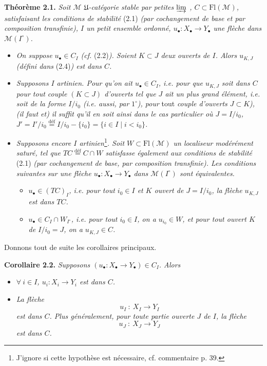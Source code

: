 \documentclass[11pt]{article}
\newcommand{\msp}[1]{\marginpar{\footnotesize [#1]}}
\newcommand{\Fl}{\mathrm{Fl}}
\newcommand{\M}{\mathcal{M}}
\begin{document}
\textbf{Théorème 2.1.} \textit{Soit $\M$ $\mathfrak{U}$-catégorie stable par petites $\varinjlim$ , $C \subset \Fl(\M)$, satisfaisant les conditions de stabilité} \textup{(2.1)} \textit{(par cochangement de base et par composition transfinie), $I$ un petit ensemble ordonné, $u_\bullet : X_\bullet \longrightarrow Y_\bullet$ une flèche dans $\M(I^\circ)$.}
\begin{itemize}[leftmargin=3em]
\item[$1^\circ$)] \textit{On suppose $u_\bullet \in C_I$ (cf.} \textup{(2.2)}\textit{). Soient $K \subset J$ deux ouverts de $I$. Alors $u_{K,J}$ (défini dans} \textup{(2.4)}\textit{) est dans $C$.}
\item[$2^\circ$)] \textit{Supposons $I$ artinien. Pour qu'on ait $u_\bullet \in C_I$, i.e. pour que $u_{K,J}$ soit dans $C$ pour tout couple $(K \subset J)$ d'ouverts tel que $J$ ait un plus grand élément, i.e. soit de la forme $I/i_0$ (i.e. aussi, par} $1^\circ$\textit{), pour} \textup{tout} \textit{couple d'ouverts $J \subset K$), (il faut et) il suffit qu'il en soit ainsi dans le cas particulier où $J = I/i_0$, $J' = I'/i_0 \overset{\text{déf}}{=} I/i_0 - \{i_0\} = \{i \in I \mid i < i_0\}$.}

\msp{page 27}
\item[$3^\circ$)] \textit{Supposons encore $I$ artinien}\footnote[11]{J'ignore si cette hypothèse est nécessaire, cf. commentaire p. 39.}\textit{. Soit $W \subset \Fl(\M)$ un localiseur modérément saturé, tel que $TC \overset{\text{déf}}{=} C \cap W$ satisfasse également aux conditions de stabilité} \textup{(2.1)} \textit{(par cochangement de base, par composition transfinie). Les conditions suivantes sur une flèche $u_\bullet : X_\bullet \longrightarrow Y_\bullet$ dans $\M(I^\circ)$ sont équivalentes.}
\begin{itemize}[leftmargin=2em]
\item[a)] \textit{$u_\bullet \in (TC)_I$, i.e. pour tout $i_0 \in I$ et $K$ ouvert de $J = I/i_0$, la flèche $u_{K,J}$ est dans $TC$.}
\item[b)] \textit{$u_\bullet \in C_I \cap W_{I^\circ}$, i.e. pour tout $i_0 \in I$, on a $u_{i_0} \in W$, et pour tout ouvert $K$ de $I/i_0 = J$, on a $u_{K,J} \in C$.}
\end{itemize}
\end{itemize}

Donnons tout de suite les corollaires principaux.

\textbf{Corollaire 2.2.} \textit{Supposons $(u_\bullet : X_\bullet \longrightarrow Y_\bullet) \in C_I$. Alors}
\begin{itemize}[leftmargin=3em]
\item[a)] \textit{$\forall\ i \in I$, $u_i : X_i \longrightarrow Y_i$ est dans $C$.}
\item[b)] \textit{La flèche}
\[
u_I \ :\ X_I \longrightarrow Y_I
\tag*{(2.2.1)}
\]
\textit{est dans $C$. Plus généralement, pour toute partie ouverte $J$ de $I$, la flèche}
\[
u_J \ :\ X_J \longrightarrow Y_J
\tag*{(2.2.2)}
\]
\textit{est dans $C$.}
\end{itemize}
\end{document}
